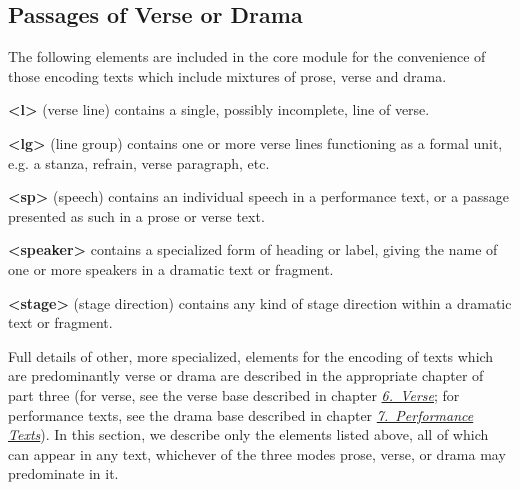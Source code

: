 \subsection[{Passages of Verse or Drama}]{Passages of Verse or Drama}\label{CODV}\par
The following elements are included in the core module for the convenience of those encoding texts which include mixtures of prose, verse and drama. 
\begin{sansreflist}
  
\item [\textbf{<l>}] (verse line) contains a single, possibly incomplete, line of verse.
\item [\textbf{<lg>}] (line group) contains one or more verse lines functioning as a formal unit, e.g. a stanza, refrain, verse paragraph, etc.
\item [\textbf{<sp>}] (speech) contains an individual speech in a performance text, or a passage presented as such in a prose or verse text.
\item [\textbf{<speaker>}] contains a specialized form of heading or label, giving the name of one or more speakers in a dramatic text or fragment.
\item [\textbf{<stage>}] (stage direction) contains any kind of stage direction within a dramatic text or fragment.
\end{sansreflist}
\par
Full details of other, more specialized, elements for the encoding of texts which are predominantly verse or drama are described in the appropriate chapter of part three (for verse, see the verse base described in chapter \textit{\hyperref[VE]{6.\ Verse}}; for performance texts, see the drama base described in chapter \textit{\hyperref[DR]{7.\ Performance Texts}}). In this section, we describe only the elements listed above, all of which can appear in any text, whichever of the three modes prose, verse, or drama may predominate in it.
